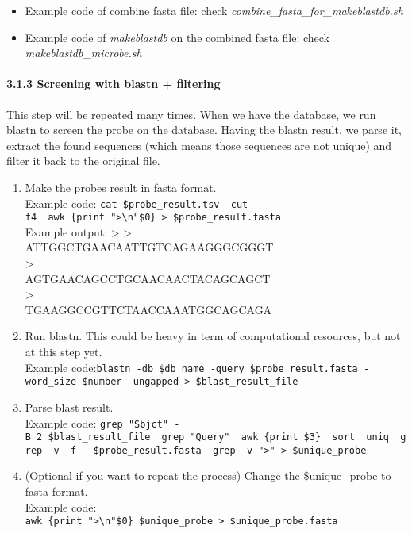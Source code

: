 \documentclass[
]{article}
\providecommand{\tightlist}{%
  \setlength{\itemsep}{0pt}\setlength{\parskip}{0pt}}
\begin{document}
\begin{itemize}
\tightlist
\item
  Example code of combine fasta file: check
  \emph{combine\_fasta\_for\_makeblastdb.sh}
\item
  Example code of \emph{makeblastdb} on the combined fasta file: check
  \emph{makeblastdb\_microbe.sh}
\end{itemize}

\paragraph{3.1.3 Screening with blastn +
filtering}\label{screening-with-blastn-filtering}

This step will be repeated many times. When we have the database, we run
blastn to screen the probe on the database. Having the blastn result, we
parse it, extract the found sequences (which means those sequences are
not unique) and filter it back to the original file.

\begin{enumerate}
\def\labelenumi{\arabic{enumi}.}
\tightlist
\item
  Make the probes result in fasta format.\\
  Example code:
  \texttt{cat\ \$probe\_result.tsv\ \textbar{}\ cut\ -f4\ \textbar{}\ awk\ \textquotesingle{}\{print\ "\textgreater{}\textbackslash{}n"\$0\}\textquotesingle{}\ \textgreater{}\ \$probe\_result.fasta}\\
  Example output: \textgreater{} \textgreater{}\\
  ATTGGCTGAACAATTGTCAGAAGGGCGGGT\\
  \textgreater{}\\
  AGTGAACAGCCTGCAACAACTACAGCAGCT\\
  \textgreater{}\\
  TGAAGGCCGTTCTAACCAAATGGCAGCAGA
\item
  Run blastn. This could be heavy in term of computational resources,
  but not at this step yet.\\
  Example
  code:\texttt{blastn\ -db\ \$db\_name\ -query\ \$probe\_result.fasta\ -word\_size\ \$number\ -ungapped\ \textgreater{}\ \$blast\_result\_file}
\item
  Parse blast result.\\
  Example code:
  \texttt{grep\ "Sbjct"\ -B\ 2\ \$blast\_result\_file\ \textbar{}\ grep\ "Query"\ \textbar{}\ awk\ \textquotesingle{}\{print\ \$3\}\textquotesingle{}\ \textbar{}\ sort\ \textbar{}\ uniq\ \textbar{}\ grep\ -v\ -f\ -\ \$probe\_result.fasta\ \textbar{}\ grep\ -v\ "\textgreater{}"\ \textgreater{}\ \$unique\_probe}
\item
  (Optional if you want to repeat the process) Change the
  \$unique\_probe to fasta format.\\
  Example code:
  \texttt{awk\ \textquotesingle{}\{print\ "\textgreater{}\textbackslash{}n"\$0\}\textquotesingle{}\ \$unique\_probe\ \textgreater{}\ \$unique\_probe.fasta}
\end{enumerate}
\end{document}
